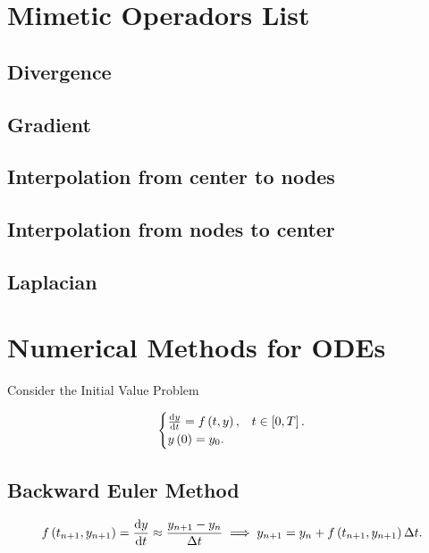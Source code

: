 \chapter{Mimetic Operadors List}

\section{Divergence}

\section{Gradient}

\section{Interpolation from center to nodes}

\section{Interpolation from nodes to center}

\section{Laplacian}

\chapter{Numerical Methods for ODEs}


Consider the Initial Value Problem

\begin{equation*}
	\begin{cases}
		\diff{y}{t}=
		f\left(t,y\right), & t\in\left[0,T\right]. \\
		y\left(0\right)=
		y_{0}.             &
	\end{cases}
\end{equation*}

\section{Backward Euler Method}
\begin{equation*}
	f\left(t_{n+1},y_{n+1}\right)
	=\diff{y}{t}\approx
	\frac{y_{n+1}-y_{n}}{\Delta t}\implies
	y_{n+1}=
	y_{n}+
	f\left(t_{n+1},y_{n+1}\right)
	\Delta t.
\end{equation*}

